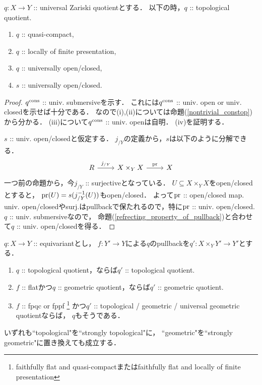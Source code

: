 \begin{Lemma}
    $q \colon X \to Y$ :: universal Zariski quotientとする．
    以下の時，$q$ :: topological quotient.
    \begin{enumerate}
        \item $q$ :: quasi-compact,
        \item $q$ :: locally of finite presentation,
        \item $q$ :: universally open/closed,
        \item $s$ :: universally open/closed.
    \end{enumerate}
\end{Lemma}
\begin{proof}
    $q^{\mathrm{cons}}$ :: univ. submersiveを示す．
    これには$q^{\mathrm{cons}}$ :: univ. open or univ. closedを示せば十分である．
    なので(i),(ii)については命題(\ref{nontrivial_constop})から分かる．
    (iii)について$q^{\mathrm{cons}}$ :: univ. openは自明．
    (iv)を証明する．

    $s$ :: univ. open/closedと仮定する．
    $j_{/Y}$の定義から，$s$は以下のように分解できる．
    \[
    \begin{tikzcd}
        R \ar[r, "j_{/Y}"]& X \times_Y X \ar[r, "\pr"]& X
    \end{tikzcd}
    \]
    一つ前の命題から，今$j_{/Y}$ :: surjectiveとなっている．
    $U \subseteq X \times_Y X$をopen/closedとすると，
    $\operatorname{pr}(U)=s(j_{/Y}^{-1}(U))$もopen/closed．
    よって$\operatorname{pr}$ :: open/closed map.
    univ. open/closedやsurj.はpullbackで保たれるので，特に$\operatorname{pr}$ :: univ. open/closed.
    $q$ :: univ. submersiveなので，
    命題(\ref{refrecting_property_of_pullback})と合わせて$q$ :: univ. open/closedを得る．
\end{proof}

\begin{Prop}
    $q \colon X \to Y$ :: equivariantとし，
    $f \colon Y' \to Y$による$q$のpullbackを$q' \colon X \times_{Y} Y' \to Y'$とする．

    \begin{enumerate}
        \item $q$ :: topological quotient，ならば$q'$ :: topological quotient.
        \item $f$ :: flatかつ$q$ :: geometric quotient，ならば$q'$ :: geometric quotient.
        \item $f$ :: fpqc or fppf 
            \footnote{faithfully flat and quasi-compactまたはfaithfully flat and locally of finite presentation}
                かつ$q'$ :: topological / geometric / universal geometric quotientならば，
                $q$もそうである．
    \end{enumerate}
    いずれも``topological"を``strongly topological"に，
    ``geometric"を``strongly geometric"に置き換えても成立する．
\end{Prop}




